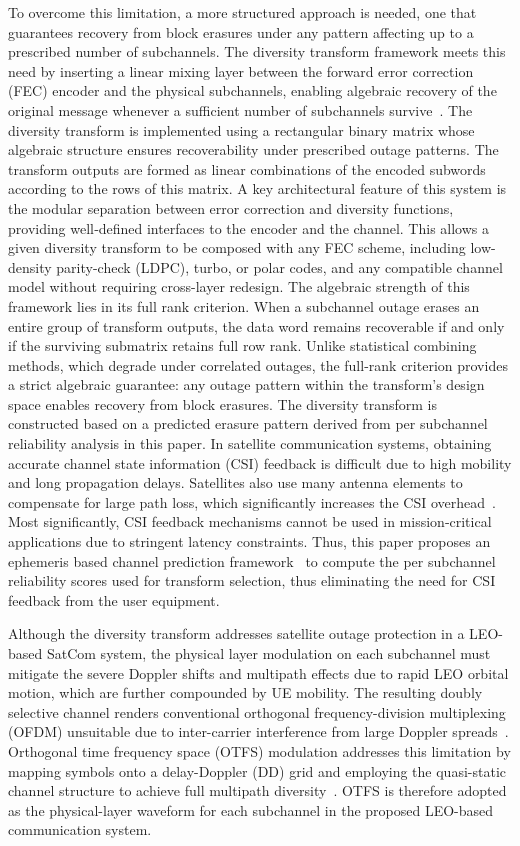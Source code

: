 \documentclass[journal]{IEEEtran}
\begin{document}
To overcome this limitation, a more structured approach is needed, one that guarantees recovery from block erasures under any pattern affecting up to a prescribed number of subchannels. The diversity transform framework meets this need by inserting a linear mixing layer between the forward error correction (FEC) encoder and the physical subchannels, enabling algebraic recovery of the original message whenever a sufficient number of subchannels survive~\cite{Arikan2025_patent,545895}. The diversity transform is implemented using a rectangular binary matrix whose algebraic structure ensures recoverability under prescribed outage patterns. The transform outputs are formed as linear combinations of the encoded subwords according to the rows of this matrix. A key architectural feature of this system is the modular separation between error correction and diversity functions, providing well‑defined interfaces to the encoder and the channel. This allows a given diversity transform to be composed with any FEC scheme, including low-density parity-check (LDPC), turbo, or polar codes, and any compatible channel model without requiring cross-layer redesign. The algebraic strength of this framework lies in its full rank criterion. When a subchannel outage erases an entire group of transform outputs, the data word remains recoverable if and only if the surviving submatrix retains full row rank. Unlike statistical combining methods, which degrade under correlated outages, the full-rank criterion provides a strict algebraic guarantee: any outage pattern within the transform’s design space enables recovery from block erasures.
The diversity transform is constructed based on a predicted erasure
pattern derived from per subchannel reliability analysis in this paper. In satellite communication systems, obtaining accurate channel state information (CSI) feedback is difficult due to high mobility and long propagation delays. Satellites also use many antenna elements to compensate for large path loss, which significantly increases the CSI overhead~\cite{Wang2025PolarXLMIMO}. Most significantly, CSI feedback mechanisms cannot be used in mission‑critical applications due to stringent latency constraints. Thus, this paper proposes an ephemeris based channel prediction framework~\cite{10902219} to compute the per subchannel reliability scores used for transform selection, thus eliminating the need for CSI feedback from the user equipment.

Although the diversity transform addresses satellite outage protection in a LEO-based SatCom system, the physical layer modulation on each subchannel must mitigate the severe Doppler shifts and multipath effects due to rapid LEO orbital motion, which are further compounded by UE mobility. The resulting doubly selective channel renders conventional orthogonal frequency-division multiplexing (OFDM) unsuitable due to inter-carrier interference from large Doppler spreads~\cite{Li2021}. Orthogonal time frequency space (OTFS) modulation addresses this limitation by mapping symbols onto a delay-Doppler (DD) grid and employing the quasi-static channel structure to achieve full multipath diversity~\cite{Hadani2017,Raviteja2018}. OTFS is therefore adopted as the physical-layer waveform for each subchannel in the proposed LEO-based communication system.
\end{document}
